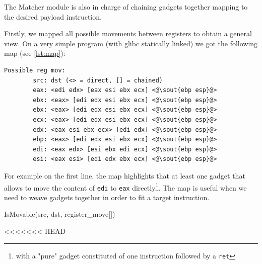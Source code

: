 \documentclass[10pt,twocolumn]{article}
\begin{document}
The Matcher module is also in charge of chaining gadgets together mapping to
the desired payload instruction.

Firstly, we mapped all possible movements between registers to obtain a general
view. On a very simple program (with glibc statically linked) we got the
following map (see \autoref{lst:map}):

\begin{lstlisting}[float=h,aboveskip=\medskipamount,belowskip=0pt,caption=Map
of movement between registers,label=lst:map]
Possible reg mov:
        src: dst (<> = direct, [] = chained)
        eax: <edi edx> [eax esi ebx ecx] <@\sout{ebp esp}@>
        ebx: <eax> [edi edx esi ebx ecx] <@\sout{ebp esp}@>
        ebx: <eax> [edi edx esi ebx ecx] <@\sout{ebp esp}@>
        ecx: <eax> [edi edx esi ebx ecx] <@\sout{ebp esp}@>
        edx: <eax esi ebx ecx> [edi edx] <@\sout{ebp esp}@>
        ebp: <eax> [edi edx esi ebx ecx] <@\sout{ebp esp}@>
        edi: <eax edx> [esi ebx edi ecx] <@\sout{ebp esp}@>
        esi: <eax esi> [edi edx ebx ecx] <@\sout{ebp esp}@>
\end{lstlisting}

For example on the first line, the map highlights that at least one gadget that
allows to move the content of \texttt{edi} to \texttt{eax}
directly\footnote{with a "pure" gadget constituted of one instruction followed
by a \texttt{ret}}. The map is useful when we need to weave gadgets together
in order to fit a target instruction.

\begin{algorithm}
    \caption{IsMovable(src, dst, register\_move[])}
    \label{alg:is_movable}
<<<<<<< HEAD
\end{algorithm}
\end{document}
